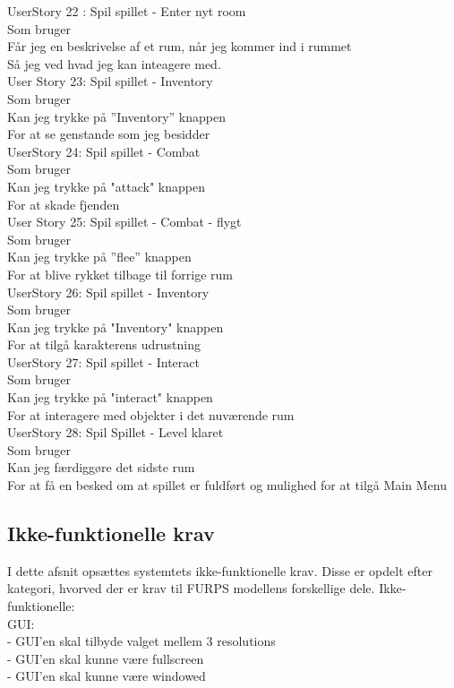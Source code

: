 UserStory 22 : Spil spillet - Enter nyt room\\
  Som bruger \\
  Får jeg en beskrivelse af et rum, når jeg kommer ind i rummet\\
  Så jeg ved hvad jeg kan inteagere med.\\

User Story 23: Spil spillet - Inventory\\
Som bruger\\
Kan jeg trykke på ”Inventory” knappen\\
For at se genstande som jeg besidder\\
  
UserStory 24: Spil spillet - Combat\\
  Som bruger\\
  Kan jeg trykke på "attack" knappen\\
  For at skade fjenden\\

User Story 25: Spil spillet - Combat - flygt\\
Som bruger\\
Kan jeg trykke på ”flee” knappen\\
For at blive rykket tilbage til forrige rum\\
  
UserStory 26: Spil spillet - Inventory\\
  Som bruger\\
  Kan jeg trykke på "Inventory" knappen\\
  For at tilgå karakterens udrustning\\
  
UserStory 27: Spil spillet - Interact\\
  Som bruger\\
  Kan jeg trykke på "interact" knappen\\
  For at interagere med objekter i det nuværende rum\\
  
UserStory 28: Spil Spillet - Level klaret\\
  Som bruger\\
  Kan jeg færdiggøre det sidste rum\\
  For at få en besked om at spillet er fuldført og mulighed for at tilgå Main Menu\\

\subsection{Ikke-funktionelle krav}
I dette afsnit opsættes systemtets ikke-funktionelle krav. Disse er opdelt efter kategori, hvorved der er krav til FURPS modellens forskellige dele. 
Ikke-funktionelle:\\
  GUI:\\
    - GUI'en skal tilbyde valget mellem 3 resolutions\\
    - GUI'en skal kunne være fullscreen\\
    - GUI'en skal kunne være windowed\\

